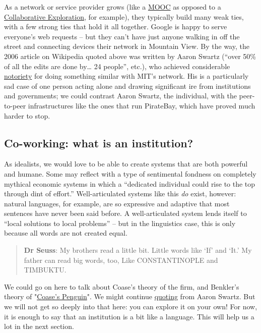 As a network or service provider grows (like a
\href{http://peeragogy.org/organize/connectivism-in-practice-how-to-organize-a-mooc/}{MOOC}
as opposed to a
\href{http://peeragogy.org/case-study-collaborative-explorations/}{Collaborative
Exploration}, for example), they typically build many weak ties, with a
few strong ties that hold it all together. Google is happy to serve
everyone's web requests -- but they can't have just anyone walking in
off the street and connecting devices their network in Mountain View. By
the way, the 2006 article on Wikipedia quoted above was written by Aaron
Swartz (``over 50\% of all the edits are done by\ldots{} 24 people'',
etc.), who achieved considerable
\href{http://www.wired.com/threatlevel/2011/07/swartz-arrest/}{notoriety}
for doing something similar with MIT's network. His is a particularly
sad case of one person acting alone and drawing significant ire from
institutions and governments; we could contrast Aaron Swartz, the
individual, with the peer-to-peer infrastructures like the ones that run
PirateBay, which have proved much harder to stop.

\subsection{Co-working: what is an institution?}

As idealists, we would love to be able to create systems that are both
powerful and humane. Some may reflect with a type of sentimental
fondness on completely mythical economic systems in which a ``dedicated
individual could rise to the top through dint of effort.''
Well-articulated systems like this \emph{do} exist, however: natural
languages, for example, are so expressive and adaptive that most
sentences have never been said before. A well-articulated system lends
itself to ``local solutions to local problems'' -- but in the
linguistics case, this is only because all words are not created equal.

\begin{quote}
\textbf{Dr Seuss}: My brothers read a little bit. Little words like `If'
and `It.' My father can read big words, too, Like CONSTANTINOPLE and
TIMBUKTU.
\end{quote}
We could go on here to talk about Coase's theory of the firm, and
Benkler's theory of
"\href{http://www.yale.edu/yalelj/112/BenklerWEB.pdf}{Coase's Penguin}".
We might continue
\href{http://www.aaronsw.com/weblog/perfectinstitutions}{quoting} from
Aaron Swartz. But we will not get so deeply into that here: you can
explore it on your own! For now, it is enough to say that an institution
is a bit like a language. This will help us a lot in the next section.

